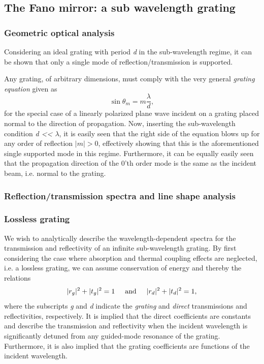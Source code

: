 \subsection{The Fano mirror: a sub wavelength grating}\label{sec:fano_mirror}

\subsubsection{Geometric optical analysis}

Considering an ideal grating with period \emph{d} in the sub-wavelength regime, it can be shown that only a single mode of reflection/transmission is supported. 

Any grating, of arbitrary dimensions, must comply with the very general \emph{grating equation}\cite{Pedrotti} given as
\begin{equation}
    \sin \theta_m = m \frac{\lambda}{d},
\end{equation}
for the special case of a linearly polarized plane wave incident on a grating placed normal to the direction of propagation. Now, inserting the sub-wavelength condition \emph{d << $\lambda$}, it is easily seen that the right side of the equation blows up for any order of reflection $|m| > 0$, effectively showing that this is the aforementioned single supported mode in this regime. Furthermore, it can be equally easily seen that the propagation direction of the 0'th order mode is the same as the incident beam, i.e. normal to the grating.

\subsubsection{Reflection/transmission spectra and line shape analysis}

\subsubsection{Lossless grating}

We wish to analytically describe the wavelength-dependent spectra for the transmission and reflectivity of an infinite sub-wavelength grating. By first considering the case where absorption and thermal coupling effects are neglected, i.e. a lossless grating, we can assume conservation of energy and thereby the relations
\begin{equation}
    |r_g|^2+|t_g|^2=1 \hspace{0.5cm} \text{and} \hspace{0.5cm} |r_d|^2+|t_d|^2=1,
    \label{eq:energy conservation}
\end{equation}
where the subscripts \emph{g} and \emph{d} indicate the \emph{grating} and \emph{direct} transmissions and reflectivities, respectively. It is implied that the direct coefficients are constants and describe the transmission and reflectivity when the incident wavelength is significantly detuned from any guided-mode resonance of the grating. Furthermore, it is also implied that the grating coefficients are functions of the incident wavelength.

